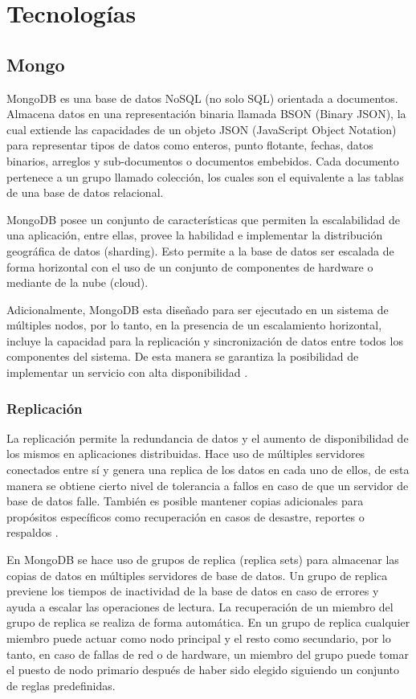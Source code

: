 \section{Tecnologías}

\subsection{Mongo}

MongoDB es una base de datos NoSQL (no solo SQL) orientada a documentos. Almacena
datos en una representación binaria llamada BSON (Binary JSON), la cual extiende
las capacidades de un objeto JSON (JavaScript Object Notation) para representar
tipos de datos como enteros, punto flotante, fechas, datos binarios, arreglos y sub-documentos o
documentos embebidos. Cada documento pertenece a un grupo llamado colección, los cuales son el
equivalente a las tablas de una base de datos relacional.

MongoDB posee un conjunto de  características que permiten la escalabilidad de una aplicación, entre ellas,
provee la habilidad e implementar la distribución geográfica de datos (sharding). Esto permite a la
base de datos ser escalada de forma horizontal con el uso de un conjunto de componentes de hardware o mediante
de la nube (cloud).

Adicionalmente, MongoDB esta diseñado para ser ejecutado en un sistema de múltiples nodos, por lo tanto,
en la presencia de un escalamiento horizontal, incluye la capacidad para la replicación
y sincronización de datos entre todos los componentes del sistema. De esta manera se garantiza la posibilidad
de implementar un servicio con alta disponibilidad \cite{10}.

\subsubsection{Replicación}

La replicación permite la redundancia de datos y el aumento de disponibilidad de los mismos en aplicaciones distribuidas.
Hace uso de múltiples servidores conectados entre sí y genera una replica de los datos en cada uno de ellos, de
esta manera se obtiene cierto nivel de tolerancia a fallos en caso de que un servidor de base de datos falle. 
También es posible mantener copias adicionales para propósitos específicos como recuperación en casos de desastre,
reportes o respaldos \cite{11}.

En MongoDB se hace uso de grupos de replica (replica sets) para almacenar las copias de datos en múltiples
servidores de base de datos. Un grupo de replica previene los tiempos de inactividad de la base de datos
en caso de errores y ayuda a escalar las operaciones de lectura. La recuperación de un miembro del grupo de
replica se realiza de forma automática. En un grupo de replica cualquier miembro puede actuar como nodo principal 
y el resto como secundario, por lo tanto, en caso de fallas de red o de hardware, un miembro del grupo
puede tomar el puesto de nodo primario después de haber sido elegido siguiendo un conjunto de reglas predefinidas.

